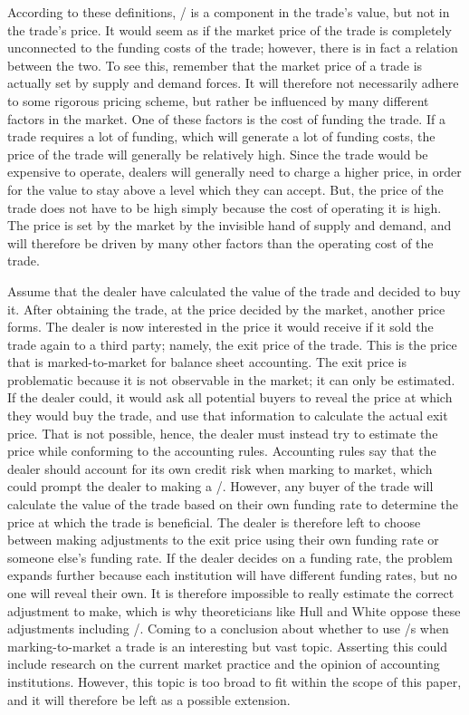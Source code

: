 \documentclass[main.tex]{subfiles}
\begin{document}
    According to these definitions, 
    \FVA/ is a component in the trade's value, but not in the trade's price. 
    It would seem as if the market price of the trade 
    is completely unconnected to the funding costs of the trade;
    however, there is in fact a relation between the two. 
    To see this, remember that the market price of a trade 
    is actually set by supply and demand forces.
    It will therefore not necessarily adhere to some rigorous pricing scheme,
    but rather be influenced by many different factors in the market.
    One of these factors is the cost of funding the trade.
    If a trade requires a lot of funding, which will generate a lot of funding costs,
    the price of the trade will generally be relatively high.
    Since the trade would be expensive to operate, 
    dealers will generally need to charge a higher price, 
    in order for the value to stay above a level which they can accept.
    But, the price of the trade does not have to be high 
    simply because the cost of operating it is high.
    The price is set by the market by the invisible hand of supply and demand,
    and will therefore be driven by many other factors than the operating cost of the trade.

    Assume that the dealer have calculated the value of the trade and decided to buy it.
    After obtaining the trade, at the price decided by the market, another price forms. 
    The dealer is now interested in the price it would receive 
    if it sold the trade again to a third party; namely, the exit price of the trade.
    This is the price that is marked-to-market for balance sheet accounting.
    The exit price is problematic because it is not observable in the market; 
    it can only be estimated.
    If the dealer could, it would ask all potential buyers to reveal the price 
    at which they would buy the trade, and use that information to calculate the actual exit price.
    That is not possible, hence, the dealer must instead try to estimate the price
    while conforming to the accounting rules.
    Accounting rules say that the dealer should account for its own credit risk 
    when marking to market, which could prompt the dealer to making a \DVA/.
    However, any buyer of the trade will calculate the value of the trade
    based on their own funding rate to determine the price at which the trade is beneficial.
    The dealer is therefore left to choose between making adjustments to the exit price
    using their own funding rate or someone else's funding rate.
    If the dealer decides on a funding rate, the problem expands further
    because each institution will have different funding rates, but no one will reveal their own.
    It is therefore impossible to really estimate the correct adjustment to make,
    which is why theoreticians like Hull and White oppose these adjustments including \FVA/.
    Coming to a conclusion about whether to use \FVA/s when marking-to-market a trade
    is an interesting but vast topic.
    Asserting this could include research on the current market practice and
    the opinion of accounting institutions.
    However, this topic is too broad to fit within the scope of this paper,
    and it will therefore be left as a possible extension.
\end{document}
